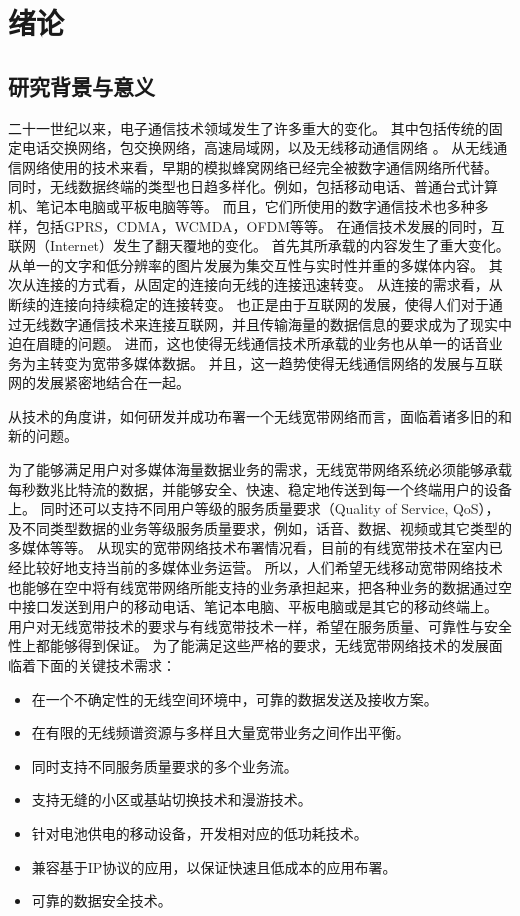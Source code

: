 \chapter{绪论}
\section{研究背景与意义}
二十一世纪以来，电子通信技术领域发生了许多重大的变化。
其中包括传统的固定电话交换网络，包交换网络，高速局域网，以及无线移动通信网络 \cite{LiShengLi2011}\cite{DingQi2010}。
从无线通信网络使用的技术来看，早期的模拟蜂窝网络已经完全被数字通信网络所代替。
同时，无线数据终端的类型也日趋多样化。例如，包括移动电话、普通台式计算机、笔记本电脑或平板电脑等等。
而且，它们所使用的数字通信技术也多种多样，包括GPRS，CDMA，WCMDA，OFDM等等。
在通信技术发展的同时，互联网（Internet）发生了翻天覆地的变化。
首先其所承载的内容发生了重大变化。从单一的文字和低分辨率的图片发展为集交互性与实时性并重的多媒体内容。
其次从连接的方式看，从固定的连接向无线的连接迅速转变。
从连接的需求看，从断续的连接向持续稳定的连接转变。
也正是由于互联网的发展，使得人们对于通过无线数字通信技术来连接互联网，并且传输海量的数据信息的要求成为了现实中迫在眉睫的问题。
进而，这也使得无线通信技术所承载的业务也从单一的话音业务为主转变为宽带多媒体数据。
并且，这一趋势使得无线通信网络的发展与互联网的发展紧密地结合在一起。
\par 从技术的角度讲，如何研发并成功布署一个无线宽带网络而言，面临着诸多旧的和新的问题。
\par 为了能够满足用户对多媒体海量数据业务的需求，无线宽带网络系统必须能够承载每秒数兆比特流的数据，并能够安全、快速、稳定地传送到每一个终端用户的设备上。
同时还可以支持不同用户等级的服务质量要求（Quality of Service, QoS），及不同类型数据的业务等级服务质量要求，例如，话音、数据、视频或其它类型的多媒体等等。
从现实的宽带网络技术布署情况看，目前的有线宽带技术在室内已经比较好地支持当前的多媒体业务运营。
所以，人们希望无线移动宽带网络技术也能够在空中将有线宽带网络所能支持的业务承担起来，把各种业务的数据通过空中接口发送到用户的移动电话、笔记本电脑、平板电脑或是其它的移动终端上。
用户对无线宽带技术的要求与有线宽带技术一样，希望在服务质量、可靠性与安全性上都能够得到保证。
为了能满足这些严格的要求，无线宽带网络技术的发展面临着下面的关键技术需求：
\begin{itemize}
\item   在一个不确定性的无线空间环境中，可靠的数据发送及接收方案。
\item   在有限的无线频谱资源与多样且大量宽带业务之间作出平衡。
\item   同时支持不同服务质量要求的多个业务流。
\item   支持无缝的小区或基站切换技术和漫游技术。
\item   针对电池供电的移动设备，开发相对应的低功耗技术。
\item   兼容基于IP协议的应用，以保证快速且低成本的应用布署。
\item   可靠的数据安全技术。
\end{itemize}

